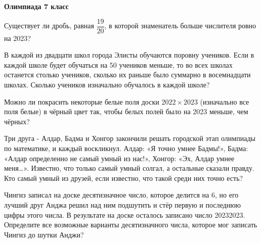 \centerline{\bf \Huge Олимпиада 7 класс}
\centerline{\bf \Huge }

\begin{flushright}
        \scriptsize{}
\end{flushright}

Существует ли дробь, равная $\dfrac{19}{20}$, в которой знаменатель больше числителя ровно на 2023?

\hspace{3mm}

В каждой из двадцати школ города Элисты обучаются поровну учеников. Если в каждой школе будет обучаться на 50 учеников меньше, то во всех школах останется столько учеников, сколько их раньше было суммарно в восемнадцати школах. Сколько учеников изначально обучалось в каждой школе? 

\hspace{3mm}

Можно ли покрасить некоторые белые поля доски $2022\times2023$ (изначально все поля белые) в чёрный цвет так, чтобы белых полей было на 2023 меньше, чем чёрных?

\hspace{3mm}

Три друга - Алдар, Бадма и Хонгор закончили решать городской этап олимпиады по математике, и каждый воскликнул. Алдар: «Я точно умнее Бадмы!», Бадма: «Алдар определенно не самый умный из нас!», Хонгор: «Эх, Алдар умнее меня…». Известно, что только самый умный солгал, а остальные сказали правду. Кто самый умный из друзей, если известно, что такой среди них точно есть?

\hspace{3mm}

Чингиз записал на доске десятизначное число, которое делится на 6, но его лучший друг Анджа решил над ним подшутить и стёр первую и последнюю цифры этого числа. В результате на доске осталось записано число 20232023. Определите все возможные варианты десятизначного числа, которое мог записать Чингиз до шутки Анджи?
